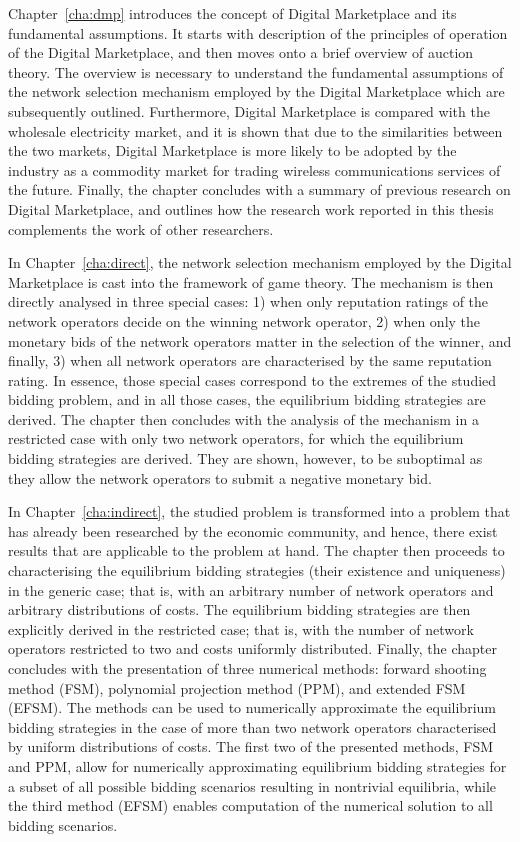 Chapter~\ref{cha:dmp} introduces the concept of Digital Marketplace and its fundamental assumptions. It starts with description of the principles of operation of the Digital Marketplace, and then moves onto a brief overview of auction theory. The overview is necessary to understand the fundamental assumptions of the network selection mechanism employed by the Digital Marketplace which are subsequently outlined. Furthermore, Digital Marketplace is compared with the wholesale electricity market, and it is shown that due to the similarities between the two markets, Digital Marketplace is more likely to be adopted by the industry as a commodity market for trading wireless communications services of the future. Finally, the chapter concludes with a summary of previous research on Digital Marketplace, and outlines how the research work reported in this thesis complements the work of other researchers.

In Chapter~\ref{cha:direct}, the network selection mechanism employed by the Digital Marketplace is cast into the framework of game theory. The mechanism is then directly analysed in three special cases: 1) when only reputation ratings of the network operators decide on the winning network operator, 2) when only the monetary bids of the network operators matter in the selection of the winner, and finally, 3) when all network operators are characterised by the same reputation rating. In essence, those special cases correspond to the extremes of the studied bidding problem, and in all those cases, the equilibrium bidding strategies are derived. The chapter then concludes with the analysis of the mechanism in a restricted case with only two network operators, for which the equilibrium bidding strategies are derived. They are shown, however, to be suboptimal as they allow the network operators to submit a negative monetary bid.

In Chapter~\ref{cha:indirect}, the studied problem is transformed into a problem that has already been researched by the economic community, and hence, there exist results that are applicable to the problem at hand. The chapter then proceeds to characterising the equilibrium bidding strategies (their existence and uniqueness) in the generic case; that is, with an arbitrary number of network operators and arbitrary distributions of costs. The equilibrium bidding strategies are then explicitly derived in the restricted case; that is, with the number of network operators restricted to two and costs uniformly distributed. Finally, the chapter concludes with the presentation of three numerical methods: forward shooting method (FSM), polynomial projection method (PPM), and extended FSM (EFSM). The methods can be used to numerically approximate the equilibrium bidding strategies in the case of more than two network operators characterised by uniform distributions of costs. The first two of the presented methods, FSM and PPM, allow for numerically approximating equilibrium bidding strategies for a subset of all possible bidding scenarios resulting in nontrivial equilibria, while the third method (EFSM) enables computation of the numerical solution to all bidding scenarios.

